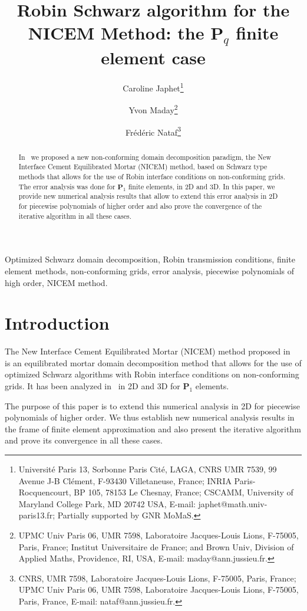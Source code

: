 \documentclass[final]{siamltex}
\title{Robin Schwarz algorithm for the NICEM Method: the ${\mathbf{P}}_q$ finite element case}
\author{Caroline Japhet\thanks{Universit\'e Paris 13, Sorbonne Paris Cit\'e, LAGA, CNRS UMR 7539,
       99 Avenue J-B Cl\'ement, F-93430 Villetaneuse, France;
  INRIA Paris-Rocquencourt, BP 105, 78153 Le Chesnay, France;
CSCAMM, University of Maryland College Park, MD 20742 USA, E-mail: japhet@math.univ-paris13.fr;
  Partially supported by GNR MoMaS.} \and
  Yvon Maday\thanks{UPMC Univ Paris 06, UMR 7598, Laboratoire Jacques-Louis Lions, F-75005, Paris, France;
  Institut Universitaire de France; and Brown Univ, Division of Applied Maths, Providence, RI, USA,
  E-mail: maday@ann.jussieu.fr. } \and Fr\'ed\'eric
  Nataf\thanks{CNRS, UMR 7598, Laboratoire Jacques-Louis Lions, F-75005, Paris, France;
  UPMC Univ Paris 06, UMR 7598, Laboratoire Jacques-Louis Lions, F-75005, Paris, France,
    E-mail: nataf@ann.jussieu.fr.}}
\begin{document}
\maketitle

\begin{abstract}
In~\cite{GJMN,JMN10} we proposed a new non-conforming domain
decomposition paradigm, the New Interface Cement Equilibrated Mortar
(NICEM) method, based on Schwarz type methods that allows for the use
of Robin interface conditions on non-conforming grids. The error
analysis was done for ${\mathbf{P}}_1$ finite elements, in 2D and 3D. In this
  paper, we provide new numerical analysis results that allow to
  extend this error analysis in 2D for piecewise polynomials of higher
  order and also prove the convergence of the iterative algorithm in
  all these cases.
\end{abstract}

\begin{keywords} 
Optimized Schwarz domain decomposition, Robin transmission conditions, 
finite element methods, non-conforming grids, error analysis, piecewise polynomials of high order, NICEM method.
\end{keywords}

\section{Introduction}
The New Interface Cement Equilibrated Mortar (NICEM) method proposed in~\cite{GJMN}
is an equilibrated mortar domain decomposition method
that allows for the use of optimized Schwarz algorithms with Robin
interface conditions on non-conforming grids.
It has been analyzed in~\cite{JMN10} in 2D and 3D for ${\mathbf{P}}_1$ elements.

The purpose of this paper is to extend this numerical analysis in 2D
for piecewise polynomials of higher order. We thus establish new numerical analysis results in the frame of finite element approximation and 
also present the iterative algorithm and prove its convergence
in all these cases.
\end{document}
